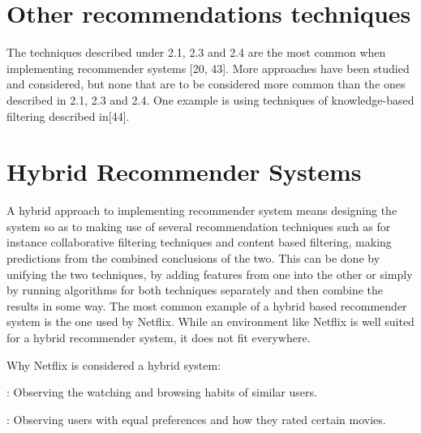 \section{Other recommendations techniques}
The techniques described under 2.1, 2.3 and 2.4 are the most common when implementing recommender systems [20, 43]. More approaches have been studied and considered, but none that are to be considered more common than the ones described in 2.1, 2.3 and 2.4. One example is using techniques of knowledge-based filtering described in[44].

\section{Hybrid Recommender Systems}
A hybrid approach to implementing recommender system means designing the system so as to making use of several recommendation techniques such as for instance collaborative filtering techniques and content based filtering, making predictions from the combined conclusions of the two. This can be done by unifying the two techniques, by adding features from one into the other or simply by running algorithms for both techniques separately and then combine the results in some way. The most common example of a hybrid based recommender system is the one used by Netflix. While an environment like Netflix is well suited for a hybrid recommender system, it does not fit everywhere.

Why Netflix is considered a hybrid system:

\begin{description}[font=$\bullet$~\textit]
\item [Collaborative Filtering]: Observing the watching and browsing habits of similar users.
\item [Content-Based Filtering]: Observing users with equal preferences and how they rated certain movies.
\end{description}







